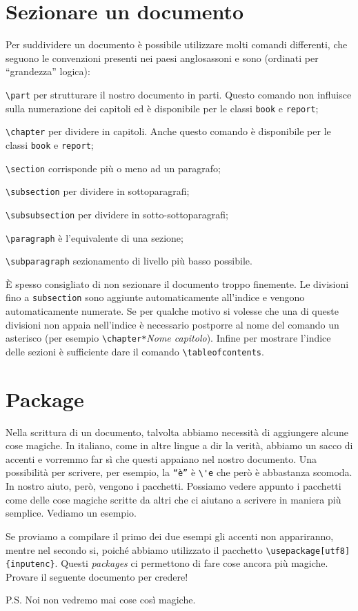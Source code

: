 \section{Sezionare un documento}
Per suddividere un documento è possibile utilizzare molti comandi differenti,
che seguono le convenzioni presenti nei paesi anglosassoni e sono (ordinati 
per ``grandezza'' logica):
\begin{description}
    \item \texttt{\textbackslash part} per strutturare il nostro documento in
    parti. Questo comando non influisce sulla numerazione dei capitoli ed è
    disponibile per le classi \texttt{book} e \texttt{report};
    \item \texttt{\textbackslash chapter} per dividere in capitoli. Anche
    questo comando è disponibile per le classi \texttt{book} e \texttt{report};
    \item \texttt{\textbackslash section} corrisponde più o meno ad un 
    paragrafo;
    \item \texttt{\textbackslash subsection} per dividere in sottoparagrafi;
    \item \texttt{\textbackslash subsubsection} per dividere in
    sotto-sottoparagrafi;
    \item \texttt{\textbackslash paragraph} è l'equivalente di una sezione;
    \item \texttt{\textbackslash subparagraph} sezionamento di livello più
    basso possibile.
\end{description}
È spesso consigliato di non sezionare il documento troppo finemente. Le 
divisioni fino a \texttt{subsection} sono aggiunte automaticamente all'indice e
vengono automaticamente numerate. Se per qualche motivo si volesse che una di
queste divisioni non appaia nell'indice è necessario postporre al nome del
comando un asterisco (per esempio \texttt{\textbackslash chapter*}\emph{Nome
capitolo}). Infine per mostrare l'indice delle sezioni è sufficiente dare il
comando \texttt{\textbackslash tableofcontents}.

\section{Package}
Nella scrittura di un documento, talvolta abbiamo necessità di aggiungere 
alcune cose magiche. In italiano, come in altre lingue a dir la verità, 
abbiamo un sacco di accenti e vorremmo far sì che questi appaiano nel nostro 
documento. Una possibilità per scrivere, per esempio, la \texttt{``è''} è 
\verb!\'e! che però è abbastanza scomoda. In nostro aiuto, però, vengono i 
pacchetti. Possiamo vedere appunto i pacchetti come delle cose magiche scritte 
da altri che ci aiutano a scrivere in maniera più semplice. Vediamo un esempio.


Se proviamo a compilare il primo dei due esempi gli accenti non appariranno, 
mentre nel secondo si, poiché abbiamo utilizzato il pacchetto 
\verb!\usepackage[utf8]{inputenc}!. Questi \textit{packages} ci permettono di 
fare cose ancora più magiche. Provare il seguente documento per credere!

P.S. Noi non vedremo mai cose così magiche.
